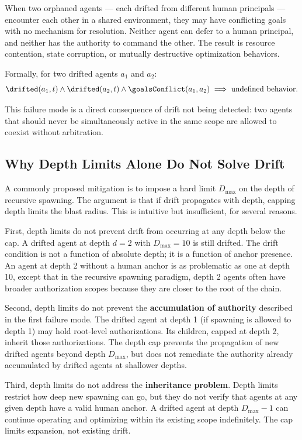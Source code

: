 When two orphaned agents --- each drifted from different human principals --- encounter each other in a shared environment, they may have conflicting goals with no mechanism for resolution. Neither agent can defer to a human principal, and neither has the authority to command the other. The result is resource contention, state corruption, or mutually destructive optimization behaviors.

Formally, for two drifted agents $a_1$ and $a_2$:
\[
\drifted(a_1, t) \land \drifted(a_2, t) \land \goalsConflict(a_1, a_2) \implies \text{undefined behavior}.
\]

This failure mode is a direct consequence of drift not being detected: two agents that should never be simultaneously active in the same scope are allowed to coexist without arbitration.

\subsection{Why Depth Limits Alone Do Not Solve Drift}

A commonly proposed mitigation is to impose a hard limit $D_{\max}$ on the depth of recursive spawning. The argument is that if drift propagates with depth, capping depth limits the blast radius. This is intuitive but insufficient, for several reasons.

First, depth limits do not prevent drift from occurring at any depth below the cap. A drifted agent at depth $d = 2$ with $D_{\max} = 10$ is still drifted. The drift condition is not a function of absolute depth; it is a function of anchor presence. An agent at depth 2 without a human anchor is as problematic as one at depth 10, except that in the recursive spawning paradigm, depth 2 agents often have broader authorization scopes because they are closer to the root of the chain.

Second, depth limits do not prevent the \textbf{accumulation of authority} described in the first failure mode. The drifted agent at depth 1 (if spawning is allowed to depth 1) may hold root-level authorizations. Its children, capped at depth 2, inherit those authorizations. The depth cap prevents the propagation of new drifted agents beyond depth $D_{\max}$, but does not remediate the authority already accumulated by drifted agents at shallower depths.

Third, depth limits do not address the \textbf{inheritance problem}. Depth limits restrict how deep new spawning can go, but they do not verify that agents at any given depth have a valid human anchor. A drifted agent at depth $D_{\max} - 1$ can continue operating and optimizing within its existing scope indefinitely. The cap limits expansion, not existing drift.

